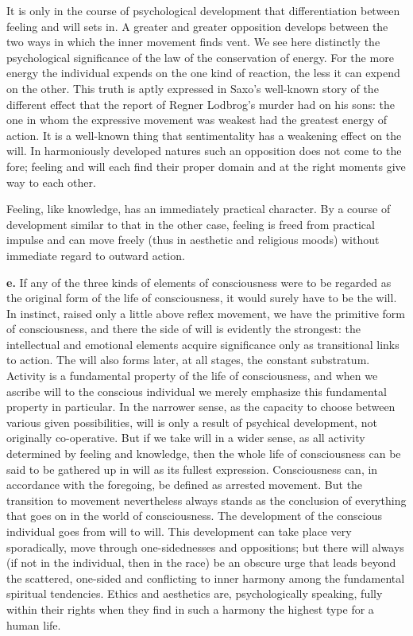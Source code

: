 \documentclass[12pt,a4paper]{book}
\newcommand{\opage}[1]{\marginnote{\footnotesize\textit{[#1]}}}
\begin{document}
It is only in the course of psychological development that
differentiation between feeling and will sets in.
\opage{118}A greater and greater opposition develops between the two ways
in which the inner movement finds vent. We see here distinctly the
psychological significance of the law of the conservation of energy. For
the more energy the individual expends on the one kind of reaction, the
less it can expend on the other. This truth is aptly expressed in Saxo's
well-known story of the different effect that the report of Regner
Lodbrog's murder had on his sons: the one in whom the expressive movement
was weakest had the greatest energy of action. It is a well-known thing
that sentimentality has a weakening effect on the will. In harmoniously
developed natures such an opposition does not come to the fore; feeling
and will each find their proper domain and at the right moments give way
to each other.

Feeling, like knowledge, has an immediately practical character. By a
course of development similar to that in the other case, feeling is
freed from practical impulse and can move freely (thus in aesthetic and
religious moods) without immediate regard to outward action.

\textbf{e.} If any of the three kinds of elements of consciousness were
to be regarded as the original form of the life of consciousness, it
would surely have to be the will. In instinct, raised only a little above
reflex movement, we have the primitive form of consciousness, and there
the side of will is evidently the strongest: the intellectual and
emotional elements acquire significance only as transitional links to
action. The will also forms later, at all stages, the constant
substratum. Activity is a fundamental property of the life of
consciousness, and when we ascribe will to the conscious individual we
merely emphasize this fundamental property in particular. In the narrower
sense, as the capacity to choose between various given possibilities,
will is only a result of psychical development, not originally
co-operative. But if we take will in a wider sense, as all activity
determined by feeling and knowledge, then the whole life of consciousness
can be said to be gathered up in will as its fullest expression.
Consciousness can, in accordance with the foregoing, be defined as
arrested movement. But the transition to movement nevertheless always
stands as the conclusion of everything that goes on in the world of
consciousness. The development of the conscious
\opage{119}individual goes from will to will. This development can take
place very sporadically, move through one-sidednesses and oppositions;
but there will always (if not in the individual, then in the race) be an
obscure urge that leads beyond the scattered, one-sided and conflicting
to inner harmony among the fundamental spiritual tendencies. Ethics and
aesthetics are, psychologically speaking, fully within their rights when
they find in such a harmony the highest type for a human life.
\end{document}
